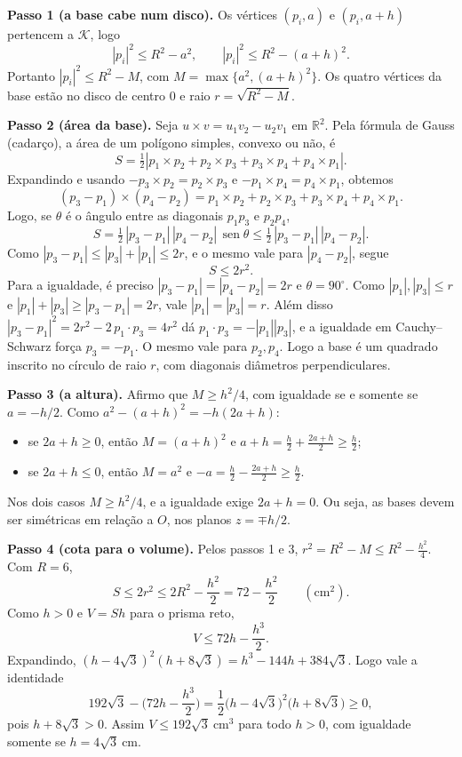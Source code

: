 \documentclass{article}%
\begin{document}
\textbf{Passo 1 (a base cabe num disco).} Os vértices $(p_i,a)$ e $(p_i,a+h)$ pertencem a $\mathcal{K}$, logo
\[
|p_i|^2\le R^2-a^2,\qquad |p_i|^2\le R^2-(a+h)^2 .
\]
Portanto $|p_i|^2\le R^2-M$, com $M=\max\{a^2,(a+h)^2\}$. Os quatro vértices da base estão no disco de centro $0$ e raio $r=\sqrt{R^2-M}$.

\textbf{Passo 2 (área da base).} Seja $u\times v=u_1v_2-u_2v_1$ em $\mathbb{R}^2$. Pela fórmula de Gauss (cadarço), a área de um polígono simples, convexo ou não, é
\[
S=\tfrac12\left|p_1\times p_2+p_2\times p_3+p_3\times p_4+p_4\times p_1\right| .
\]
Expandindo e usando $-p_3\times p_2=p_2\times p_3$ e $-p_1\times p_4=p_4\times p_1$, obtemos
\[
(p_3-p_1)\times(p_4-p_2)=p_1\times p_2+p_2\times p_3+p_3\times p_4+p_4\times p_1 .
\]
Logo, se $\theta$ é o ângulo entre as diagonais $p_1p_3$ e $p_2p_4$,
\[
S=\tfrac12\,|p_3-p_1|\,|p_4-p_2|\,\operatorname{sen}\theta\le \tfrac12\,|p_3-p_1|\,|p_4-p_2| .
\]
Como $|p_3-p_1|\le |p_3|+|p_1|\le 2r$, e o mesmo vale para $|p_4-p_2|$, segue
\[
S\le 2r^2 .
\]
Para a igualdade, é preciso $|p_3-p_1|=|p_4-p_2|=2r$ e $\theta=90^\circ$. Como $|p_1|,|p_3|\le r$ e $|p_1|+|p_3|\ge|p_3-p_1|=2r$, vale $|p_1|=|p_3|=r$. Além disso $|p_3-p_1|^2=2r^2-2\,p_1\cdot p_3=4r^2$ dá $p_1\cdot p_3=-|p_1||p_3|$, e a igualdade em Cauchy–Schwarz força $p_3=-p_1$. O mesmo vale para $p_2,p_4$. Logo a base é um quadrado inscrito no círculo de raio $r$, com diagonais diâmetros perpendiculares.

\textbf{Passo 3 (a altura).} Afirmo que $M\ge h^2/4$, com igualdade se e somente se $a=-h/2$. Como $a^2-(a+h)^2=-h(2a+h)$:
\begin{itemize}
\item se $2a+h\ge 0$, então $M=(a+h)^2$ e $a+h=\tfrac h2+\tfrac{2a+h}{2}\ge \tfrac h2$;
\item se $2a+h\le 0$, então $M=a^2$ e $-a=\tfrac h2-\tfrac{2a+h}{2}\ge \tfrac h2$.
\end{itemize}
Nos dois casos $M\ge h^2/4$, e a igualdade exige $2a+h=0$. Ou seja, as bases devem ser simétricas em relação a $O$, nos planos $z=\mp h/2$.

\textbf{Passo 4 (cota para o volume).} Pelos passos 1 e 3, $r^2=R^2-M\le R^2-\tfrac{h^2}{4}$. Com $R=6$,
\[
S\le 2r^2\le 2R^2-\frac{h^2}{2}=72-\frac{h^2}{2}\qquad(\text{cm}^2).
\]
Como $h>0$ e $V=Sh$ para o prisma reto,
\[
V\le 72h-\frac{h^3}{2}.
\]
Expandindo, $(h-4\sqrt3)^2(h+8\sqrt3)=h^3-144h+384\sqrt3$. Logo vale a identidade
\[
192\sqrt3-\Big(72h-\frac{h^3}{2}\Big)=\frac12\big(h-4\sqrt3\big)^2\big(h+8\sqrt3\big)\ge 0 ,
\]
pois $h+8\sqrt3>0$. Assim $V\le 192\sqrt3\ \text{cm}^3$ para todo $h>0$, com igualdade somente se $h=4\sqrt3\ \text{cm}$.
\end{document}

